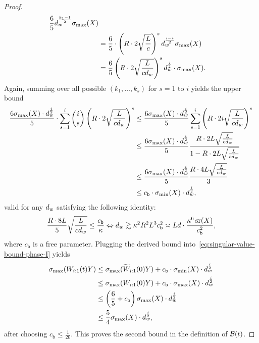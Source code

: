\begin{proof}
\begin{align*}
    \frac{6}{5} d_{w}^{\frac{k_{1} - 1}{2}} \sigma_{\max}(X) \\
    &=
    \frac{6}{5} \cdot \left(R \cdot 2 \sqrt{\frac{L}{c}}\right)^{s} d_{w}^{\frac{i - s}{2}} \sigma_{\max}(X) \\
    &=
    \frac{6}{5} \left(R \cdot 2 \sqrt{\frac{L}{c d_{w}}}\right)^{s} d_{w}^{\frac{i}{2}} \cdot \sigma_{\max}(X).
  \end{align*}
  Again, summing over all possible $(k_{1}, \dots, k_{s})$ for $s = 1$ to $i$
  yields the upper bound
  \begin{align*}
     \frac{6\sigma_{\max}(X) \cdot d_{w}^{\frac{i}{2}}}{5} \cdot \sum_{s = 1}^{i} \binom{i}{s}
    \left(R \cdot 2 \sqrt{\frac{L}{c d_{w}}}\right)^{s} 
    &\leq
    \frac{6 \sigma_{\max}(X) \cdot d_{w}^{\frac{i}{2}}}{5}
    \sum_{s = 1}^{i} \left(R \cdot 2 i \sqrt{\frac{L}{cd_{w}}}\right)^{s} \\
    &\leq
    \frac{6 \sigma_{\max}(X) \cdot d_{w}^{\frac{i}{2}}}{5}
    \frac{R \cdot 2 L \sqrt{\frac{L}{c d_{w}}}}{1 - R \cdot  2L \sqrt{\frac{L}{c d_{w}}}} \\ 
    &\leq
    \frac{6 \sigma_{\max}(X) \cdot d_{w}^{\frac{i}{2}}}{5}
    \frac{R \cdot 4 L \sqrt{\frac{L}{c d_{w}}}}{3} \\
    &\leq
    c_{\mathsf{b}} \cdot \sigma_{\min}(X) \cdot d_{w}^{\frac{i}{2}},
  \end{align*}
  valid for any $d_{w}$ satisfying the following identity:
  \[
    \frac{R \cdot 8L}{5} \sqrt{\frac{L}{c d_{w}}} \leq \frac{c_{\mathsf{b}}}{\kappa}
    \Leftrightarrow
    d_{w} \gtrsim  \kappa^2 R^2 L^3 c_{\mathsf{b}}^2
    \asymp
    L d \cdot \frac{\kappa^6 \operatorname{\mathrm{sr}}(X)}{c_{\mathsf{b}}^2},
  \]
   where $c_{\mathsf{b}}$ is a free parameter. Plugging
  the derived bound into~\eqref{eq:singular-value-bound-phase-I} yields
  \begin{align*}
    \sigma_{\max}(W_{i:1}(t)Y) &\leq
    \sigma_{\max}(\widetilde{W}_{i:1}(0) Y) + c_{\mathsf{b}} \cdot \sigma_{\min}(X) \cdot d_{w}^{\frac{i}{2}} \\
                               &\leq
                               \sigma_{\max}(W_{i:1}(0) Y) + c_{\mathsf{b}} \cdot \sigma_{\max}(X) \cdot d_{w}^{\frac{i}{2}} \\
                               &\leq
                               \left( \frac{6}{5} + c_{\mathsf{b}} \right) \sigma_{\max}(X) \cdot d_{w}^{\frac{i}{2}} \\
                               &\leq
                               \frac{5}{4} \sigma_{\max}(X) \cdot d_{w}^{\frac{i}{2}},
  \end{align*}
  after choosing $c_{\mathsf{b}} \leq \frac{1}{20}$. This proves the second bound
  in the definition of $\mathcal{B}(t)$.



\end{proof}
